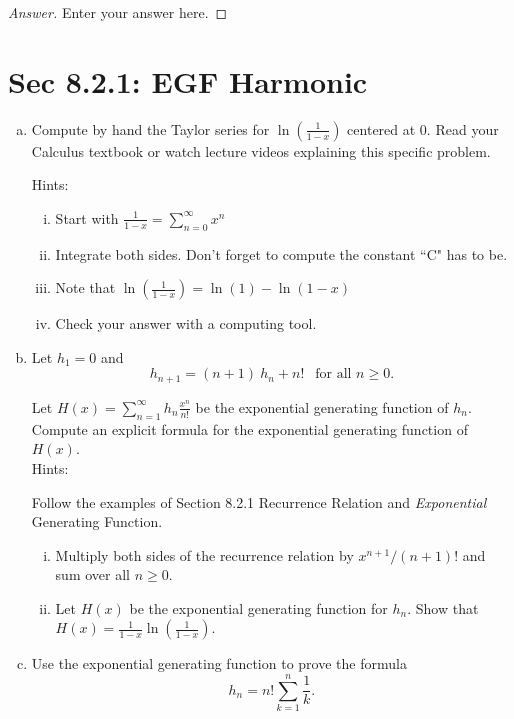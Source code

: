 \documentclass[12pt, oneside]{amsart}
\begin{document}
\begin{proof}[Answer]
	Enter your answer here.
\end{proof}


\section{Sec 8.2.1: 
	EGF Harmonic}

\begin{enumerate}[a.]
	\item
	Compute by hand the Taylor series for $\ln\left(\frac{1}{1-x}\right)$ centered at $0$. 
	Read your Calculus textbook or watch lecture videos explaining this specific problem.\\
	
{\tiny \noindent Hints: 
	 \begin{enumerate}[i.] \item Start with $\frac{1}{1-x}=\sum_{n=0}^\infty x^n$ \item Integrate both sides. Don't forget to compute  the constant ``C" has to be. \item Note that $\ln\left(\frac{1}{1-x}\right)=\ln(1)-\ln(1-x)$ \item Check your answer with a computing tool. \end{enumerate}
 }

	
	\item
	Let $h_1=0$  and \[h_{n+1}= (n+1) ~h_{n} + n! ~~ \text{ for all $n \geq 0$}. \]

Let $H(x)=\sum_{n=1}^\infty h_n \frac{x^n}{n!}$ be the exponential generating function of $h_n$. Compute an explicit formula for the exponential generating function of $H(x)$.\\
	
		{\tiny \noindent Hints: }
	\\ {\tiny Follow the examples of Section 8.2.1 Recurrence Relation and \emph{Exponential} Generating Function. \begin{enumerate}[i.] \item Multiply both sides of the recurrence relation by $x^{n+1}/(n+1)!$ and sum over all $n \geq 0$. \item Let $H(x)$ be the exponential generating function for $h_n$. Show that $H(x)= \frac{1}{1-x} \ln\left(\frac{1}{1-x}\right)$.  \end{enumerate}}
	
	
	
	\item 
	Use the exponential generating function to prove the formula 
	\begin{equation*}
	h_n = n! \sum_{k=1}^n \frac{1}{k}.
	\end{equation*}
	

\end{enumerate}
\end{document}
